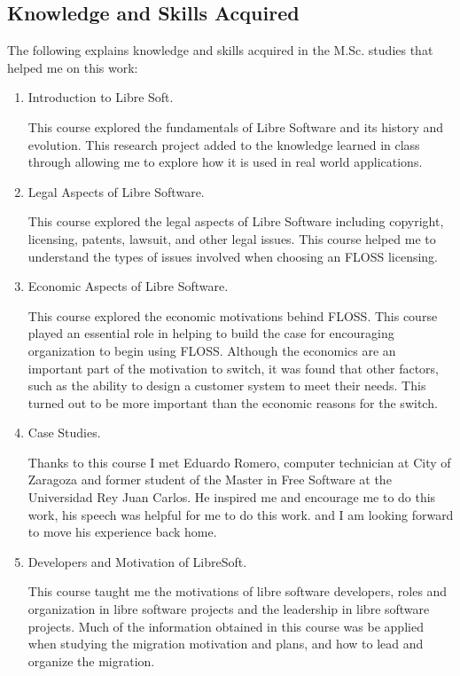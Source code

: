 \subsection{Knowledge and Skills Acquired }
The following explains knowledge and skills acquired in the M.Sc. studies that helped me on
this work:
	\begin{enumerate}
	
\item Introduction to Libre Soft.

 This course explored the fundamentals of Libre Software and its history and evolution. This research project added to the knowledge learned in class through allowing me to explore how it is used in real world applications.

\item Legal Aspects of Libre Software. 

This course explored the legal aspects of Libre Software including copyright, licensing, patents, lawsuit, and other legal issues. This course helped me to understand the types of issues involved when choosing an FLOSS licensing. 

\item Economic Aspects of Libre Software.

 This course explored the economic motivations behind FLOSS. This course played an essential role in helping to build the case for encouraging organization to begin using FLOSS. Although the economics are an important part of the motivation to switch, it was found that other factors, such as the ability to design a customer system to meet their needs. This turned out to be more important than the economic reasons for the switch. 
 
\item  Case Studies.

Thanks to this course I met Eduardo Romero, computer technician at City of Zaragoza and former student of the Master in Free Software at the Universidad Rey Juan Carlos. He inspired me and encourage me to do this work, his speech was helpful for me to do this work. and I am looking forward to move his experience back home. 
                 
   \item Developers and Motivation of LibreSoft.
                 
 This course taught me the motivations of libre software developers, roles and organization in libre software projects and the leadership in libre software projects. Much of the information obtained in this course was be applied when studying the migration motivation and plans, and how to lead and organize the migration.
 

\end{enumerate}
